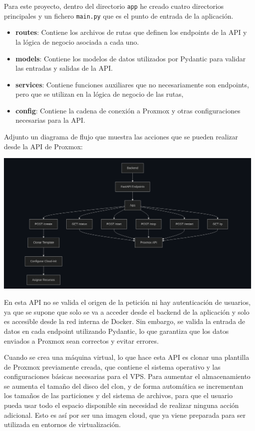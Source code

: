 \documentclass[11pt,oneside,a4paper]{book}
\begin{document}
Para este proyecto, dentro del directorio \texttt{app} he creado cuatro directorios principales y un fichero \texttt{main.py} que es el punto de entrada de la aplicación.
\begin{itemize}
    \item \textbf{routes}: Contiene los archivos de rutas que definen los endpoints de la API y la lógica de negocio asociada a cada uno.
    \item \textbf{models}: Contiene los modelos de datos utilizados por Pydantic para validar las entradas y salidas de la API.
    \item \textbf{services}: Contiene funciones auxiliares que no necesariamente son endpoints, pero que se utilizan en la lógica de negocio de las rutas,
    \item \textbf{config}: Contiene la cadena de conexión a Proxmox y otras configuraciones necesarias para la API.
\end{itemize}

Adjunto un diagrama de flujo que muestra las acciones que se pueden realizar desde la API de Proxmox:
\begin{center}
\includegraphics[width=14cm]{img/diagrama_proxmox.png}
\end{center}

En esta API no se valida el origen de la petición ni hay autenticación de usuarios, ya que se supone que solo se va a acceder desde el backend de la aplicación y solo es accesible desde la red interna de Docker. Sin embargo, se valida la entrada de datos en cada endpoint utilizando Pydantic, lo que garantiza que los datos enviados a Proxmox sean correctos y evitar errores.

Cuando se crea una máquina virtual, lo que hace esta API es clonar una plantilla de Proxmox previamente creada, que contiene el sistema operativo y las configuraciones básicas necesarias para el VPS. Para aumentar el almacenamiento se aumenta el tamaño del disco del clon, y de forma automática se incrementan los tamaños de las particiones y del sistema de archivos, para que el usuario pueda usar todo el espacio disponible sin necesidad de realizar ninguna acción adicional. Esto es así por ser una imagen cloud, que ya viene preparada para ser utilizada en entornos de virtualización.
\end{document}
